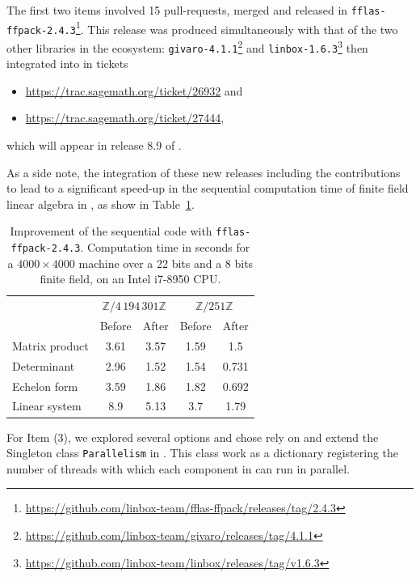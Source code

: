 \documentclass{deliverablereport}
\begin{document}
The first two items involved 15 pull-requests, merged and released in
\texttt{fflas-ffpack-2.4.3}\footnote{\url{https://github.com/linbox-team/fflas-ffpack/releases/tag/2.4.3}}. This release
was produced simultaneously with that of the two other libraries in the \Linbox
ecosystem: \texttt{givaro-4.1.1}\footnote{\url{https://github.com/linbox-team/givaro/releases/tag/4.1.1}} and
\texttt{linbox-1.6.3}\footnote{\url{https://github.com/linbox-team/linbox/releases/tag/v1.6.3}} then integrated into \SageMath
in tickets
\begin{itemize}
\item  \url{https://trac.sagemath.org/ticket/26932} and
\item  \url{https://trac.sagemath.org/ticket/27444},
\end{itemize}
which will appear in release 8.9 of \SageMath.

As a side note, the integration of these new releases including the contributions to  lead
to a significant speed-up in the sequential computation time of finite field linear algebra in \SageMath, as show in
Table~\ref{tab:release}.
%
\begin{table}[htb]
  \begin{tabular}{lcccc}
    \toprule
&    \multicolumn{2}{c}{$\mathbb{Z}/4\,194\,301\mathbb{Z}$}&    \multicolumn{2}{c}{$\mathbb{Z}/251\mathbb{Z}$}\\
    & Before & After & Before & After\\
    \midrule
    Matrix product & 3.61& 3.57&1.59&1.5 \\
    Determinant &  2.96& 1.52 &1.54&0.731\\
    Echelon form & 3.59& 1.86 & 1.82& 0.692 \\
    Linear system & 8.9 & 5.13 & 3.7&1.79\\ 
    \bottomrule
  \end{tabular}
  \vspace{1em}
  
  \caption{Improvement of the sequential code with \texttt{fflas-ffpack-2.4.3}. Computation time in seconds for a
    $4000\times    4000$ machine over a 22 bits and a 8 bits finite field, on an Intel i7-8950 CPU.}
  \label{tab:release}
\end{table}

For Item (3), we explored several options and chose rely on and extend the Singleton class \texttt{Parallelism} in
\SageMath. This class work as a dictionary registering the number of threads with which each component in \SageMath can
run in parallel.
\end{document}
